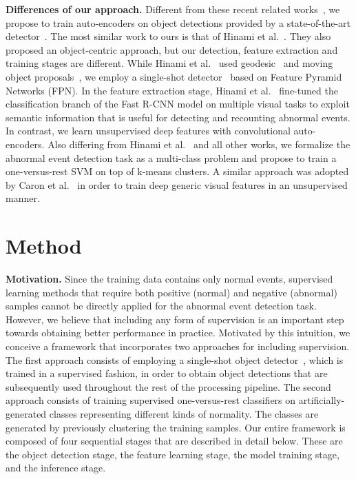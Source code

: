 \documentclass[10pt,twocolumn,letterpaper]{article}
\begin{document}
\noindent
{\bf Differences of our approach.}
Different from these recent related works~\cite{Hasan-CVPR-2016,Sabokrou-IP-2017,Xu-BMVC-2015,Xu-CVIU-2017}, we propose to train auto-encoders on object detections provided by a state-of-the-art detector~\cite{Lin-CVPR-2017}. The most similar work to ours is that of Hinami et al.~\cite{Hinami-ICCV-2017}. They also proposed an object-centric approach, but our detection, feature extraction and training stages are different. While Hinami et al.~\cite{Hinami-ICCV-2017} used geodesic~\cite{Koltun-ECCV-2014} and moving object proposals~\cite{Fragkiadaki-ICCV-2015}, we employ a single-shot detector~\cite{Lin-CVPR-2017} based on Feature Pyramid Networks (FPN). In the feature extraction stage, Hinami et al.~\cite{Hinami-ICCV-2017} fine-tuned the classification branch of the Fast R-CNN model on multiple visual tasks to exploit semantic information that is useful for detecting and recounting abnormal events. In contrast, we learn unsupervised deep features with convolutional auto-encoders. Also differing from Hinami et al.~\cite{Hinami-ICCV-2017} and all other works, we formalize the abnormal event detection task as a multi-class problem and propose to train a one-versus-rest SVM on top of k-means clusters. A similar approach was adopted by Caron et al.~\cite{Caron-ECCV-2018} in order to train deep generic visual features in an unsupervised manner.

\vspace*{-0.2cm}
\section{Method}
\label{sec_Method}
\vspace*{-0.1cm}

\noindent
{\bf Motivation.}
Since the training data contains only normal events, supervised learning methods that require both positive (normal) and negative (abnormal) samples cannot be directly applied for the abnormal event detection task. However, we believe that including any form of  supervision is an important step towards obtaining better performance in practice. Motivated by this intuition, we conceive a framework that incorporates two approaches for including supervision. The first approach consists of employing a single-shot object detector~\cite{Lin-CVPR-2017}, which is trained in a supervised fashion, in order to obtain object detections that are subsequently used throughout the rest of the processing pipeline. The second approach consists of training supervised one-versus-rest classifiers on artificially-generated classes representing different kinds of normality. The classes are generated by previously clustering the training samples. Our entire framework is composed of four sequential stages that are described in detail below. These are the object detection stage, the feature learning stage, the model training stage, and the inference stage.
\end{document}
